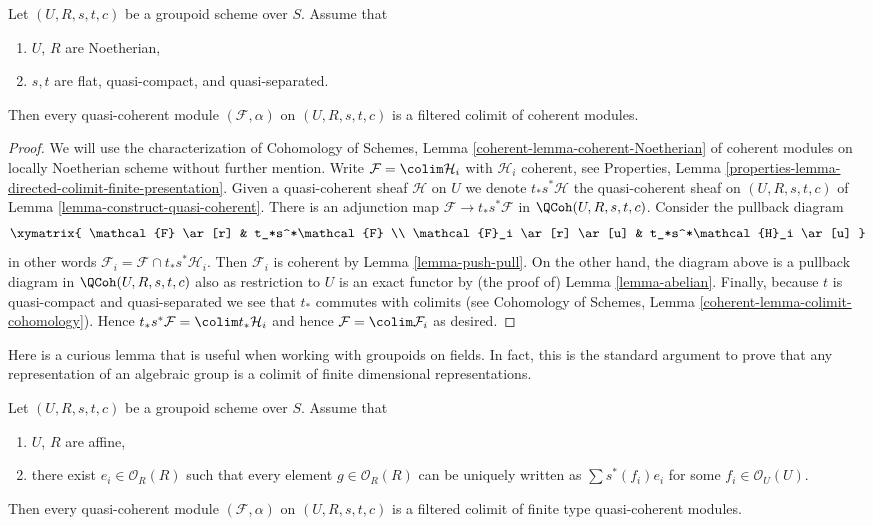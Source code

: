 \begin{lemma}
\label{lemma-colimit-coherent}
Let $(U, R, s, t, c)$ be a groupoid scheme over $S$.
Assume that
\begin{enumerate}
\item $U$, $R$ are Noetherian,
\item $s, t$ are flat, quasi-compact, and quasi-separated.
\end{enumerate}
Then every quasi-coherent module $(\mathcal{F}, \alpha)$ on $(U, R, s, t, c)$
is a filtered colimit of coherent modules.
\end{lemma}

\begin{proof}
We will use the characterization of Cohomology of Schemes, Lemma
\ref{coherent-lemma-coherent-Noetherian} of coherent modules on locally
Noetherian scheme without further mention. Write
$\mathcal{F} = \colim \mathcal{H}_i$ with $\mathcal{H}_i$ coherent, see
Properties, Lemma \ref{properties-lemma-directed-colimit-finite-presentation}.
Given a quasi-coherent sheaf $\mathcal{H}$ on $U$ we denote $t_*s^*\mathcal{H}$
the quasi-coherent sheaf on $(U, R, s, t, c)$ of
Lemma \ref{lemma-construct-quasi-coherent}. There is an adjunction map
$\mathcal{F} \to t_*s^*\mathcal{F}$ in $\QCoh(U, R, s, t, c)$.
Consider the pullback diagram
$$
\xymatrix{
\mathcal{F} \ar[r] & t_*s^*\mathcal{F} \\
\mathcal{F}_i \ar[r] \ar[u] & t_*s^*\mathcal{H}_i \ar[u]
}
$$
in other words $\mathcal{F}_i = \mathcal{F} \cap t_*s^*\mathcal{H}_i$.
Then $\mathcal{F}_i$ is coherent by Lemma \ref{lemma-push-pull}.
On the other hand, the diagram above is a pullback diagram in
$\QCoh(U, R, s, t, c)$ also as restriction to $U$ is an
exact functor by (the proof of) Lemma \ref{lemma-abelian}. Finally,
because $t$ is quasi-compact and quasi-separated we see that
$t_*$ commutes with colimits (see
Cohomology of Schemes, Lemma \ref{coherent-lemma-colimit-cohomology}).
Hence $t_*s^*\mathcal{F} = \colim t_*\mathcal{H}_i$ and hence
$\mathcal{F} = \colim \mathcal{F}_i$ as desired.
\end{proof}

\noindent
Here is a curious lemma that is useful when working with groupoids
on fields. In fact, this is the standard argument to prove that any
representation of an algebraic group is a colimit of finite dimensional
representations.

\begin{lemma}
\label{lemma-colimit-finite-type}
Let $(U, R, s, t, c)$ be a groupoid scheme over $S$.
Assume that
\begin{enumerate}
\item $U$, $R$ are affine,
\item there exist $e_i \in \mathcal{O}_R(R)$ such that
every element $g \in \mathcal{O}_R(R)$ can be uniquely written as
$\sum s^*(f_i)e_i$ for some $f_i \in \mathcal{O}_U(U)$.
\end{enumerate}
Then every quasi-coherent module $(\mathcal{F}, \alpha)$ on $(U, R, s, t, c)$
is a filtered colimit of finite type quasi-coherent modules.
\end{lemma}

